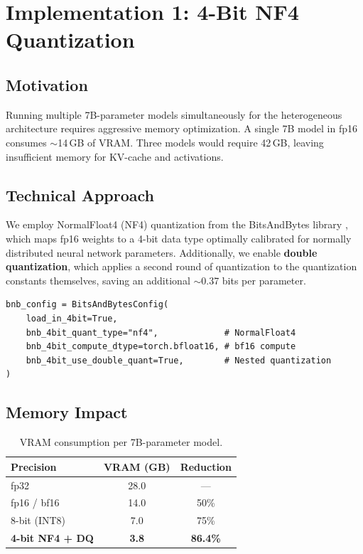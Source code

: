 \documentclass[12pt, a4paper]{article}
\begin{document}
\section{Implementation 1: 4-Bit NF4 Quantization}
\label{sec:quantization}

\subsection{Motivation}

Running multiple 7B-parameter models simultaneously for the heterogeneous
architecture requires aggressive memory optimization. A single 7B model
in fp16 consumes $\sim$14\,GB of VRAM. Three models would require 42\,GB,
leaving insufficient memory for KV-cache and activations.

\subsection{Technical Approach}

We employ NormalFloat4 (NF4) quantization from the BitsAndBytes library
\cite{dettmers2023qlora}, which maps fp16 weights to a 4-bit data type
optimally calibrated for normally distributed neural network parameters.
Additionally, we enable \textbf{double quantization}, which applies a second
round of quantization to the quantization constants themselves, saving an
additional $\sim$0.37 bits per parameter.

\begin{lstlisting}[caption={BitsAndBytes NF4 configuration in \texttt{LocalServerLLMWrapper}.}]
bnb_config = BitsAndBytesConfig(
    load_in_4bit=True,
    bnb_4bit_quant_type="nf4",             # NormalFloat4
    bnb_4bit_compute_dtype=torch.bfloat16, # bf16 compute
    bnb_4bit_use_double_quant=True,        # Nested quantization
)
\end{lstlisting}

\subsection{Memory Impact}

\begin{table}[H]
\centering
\caption{VRAM consumption per 7B-parameter model.}
\label{tab:vram}
\begin{tabular}{lcc}
\toprule
\textbf{Precision} & \textbf{VRAM (GB)} & \textbf{Reduction} \\
\midrule
fp32              & 28.0  & ---    \\
fp16 / bf16       & 14.0  & 50\%   \\
8-bit (INT8)      & 7.0   & 75\%   \\
\textbf{4-bit NF4 + DQ} & \textbf{3.8}  & \textbf{86.4\%} \\
\bottomrule
\end{tabular}
\end{table}
\end{document}
